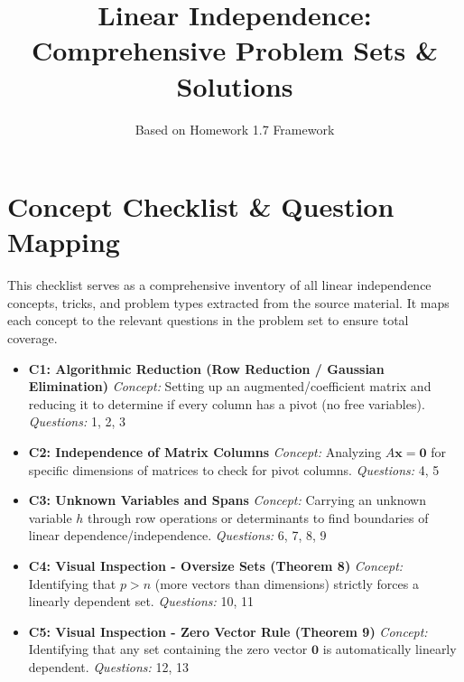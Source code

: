 \documentclass[12pt]{article}
\title{Linear Independence: Comprehensive Problem Sets \& Solutions}
\author{Based on Homework 1.7 Framework}
\date{}
\begin{document}
\maketitle

\tableofcontents
\newpage

\section{Concept Checklist \& Question Mapping}
This checklist serves as a comprehensive inventory of all linear independence concepts, tricks, and problem types extracted from the source material. It maps each concept to the relevant questions in the problem set to ensure total coverage.

\begin{itemize}
    \item \textbf{C1: Algorithmic Reduction (Row Reduction / Gaussian Elimination)} 
    \newline \textit{Concept:} Setting up an augmented/coefficient matrix and reducing it to determine if every column has a pivot (no free variables).
    \newline \textit{Questions:} 1, 2, 3
    
    \item \textbf{C2: Independence of Matrix Columns}
    \newline \textit{Concept:} Analyzing $A\mathbf{x} = \mathbf{0}$ for specific dimensions of matrices to check for pivot columns.
    \newline \textit{Questions:} 4, 5
    
    \item \textbf{C3: Unknown Variables and Spans}
    \newline \textit{Concept:} Carrying an unknown variable $h$ through row operations or determinants to find boundaries of linear dependence/independence.
    \newline \textit{Questions:} 6, 7, 8, 9
    
    \item \textbf{C4: Visual Inspection - Oversize Sets (Theorem 8)}
    \newline \textit{Concept:} Identifying that $p > n$ (more vectors than dimensions) strictly forces a linearly dependent set.
    \newline \textit{Questions:} 10, 11
    
    \item \textbf{C5: Visual Inspection - Zero Vector Rule (Theorem 9)}
    \newline \textit{Concept:} Identifying that any set containing the zero vector $\mathbf{0}$ is automatically linearly dependent.
    \newline \textit{Questions:} 12, 13
    

\end{itemize}
\end{document}
